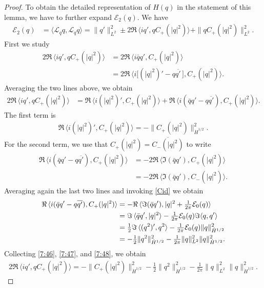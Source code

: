 \documentclass[10pt,a4paper]{amsart}
\newcommand{\Lc}{\mathcal{L}}
\newcommand{\lan}{\langle}
\newcommand{\ran}{\rangle}
\begin{document}
\begin{proof}
To obtain the detailed representation of $H(q)$ in the statement of this lemma, we have to further expand $\mathcal E_2(q)$.  We have
\begin{align}\label{eqn:E_2_expansion}
\mathcal{E}_2(q)&=\lan \Lc_qq,\Lc_qq\ran=\|q'\|_{L^2}^2\pm 2\Re\,\lan iq',q C_+(|q|^2)\ran+\|q C_+(|q|^2)\|_{L^2}^2.
\end{align}
First we study
\begin{align*}
2\Re\,\lan iq',q C_+(|q|^2)\ran&=2\Re\,\lan i\bar{q}q', C_+(|q|^2)\ran\\
&=2\Re\,\lan i\bigl[(|q|^2)'-q\overline{q'}\,\bigr], C_+(|q|^2)\ran.
\end{align*}
Averaging the two lines above, we obtain
\begin{align}\label{7:46}
2\Re\,\lan iq',q C_+(|q|^2)\ran&=\Re\,\lan i(|q|^2)', C_+(|q|^2)\ran+\Re\,\lan i(\bar{q}q'-q\overline{q'}), C_+(|q|^2)\ran.
\end{align}
The first term is
\begin{align}\label{7:47}
\Re\,\lan i(|q|^2)', C_+(|q|^2)\ran=-\| C_+(|q|^2)\|_{\dot{H}^{1/2}}^2.
\end{align}
For the second term, we use that $ C_+(|q|^2)=\overline{C_-(|q|^2)}$ to write
\begin{align*}
\Re\,\lan i(\bar{q}q'-q\overline{q'}), C_+(|q|^2)\ran
&=-2\Re\,\lan\Im(\bar{q}q'), C_+(|q|^2)\ran\\
&=-2\Re\,\lan\Im(\bar{q}q'),C_-(|q|^2)\ran.
\end{align*}
Averaging again the last two lines and invoking \eqref{Cid} we obtain
\begin{align}\label{7:48}
\Re\, \lan i(\bar{q}q'-q\overline{q'}), C_+(|q|^2)\ran\notag
&=-\Re\,\lan \Im(\bar{q}q'),|q|^2+\tfrac1{2\pi}\mathcal{E}_0(q)\ran\notag\\
&=\Im\,\lan\bar{q}q',|q|^2\ran-\tfrac1{2\pi}\mathcal{E}_0(q)\Im\lan q,q'\ran\notag\\
&=\tfrac12 \Im\,\lan (q^2)',q^2\ran-\tfrac1{2\pi}\mathcal{E}_0(q)\|q\|_{\dot H^{1/2}}^2\notag\\
&=-\tfrac12\|q^2\|_{\dot{H}^{1/2}}^2-\tfrac1{2\pi}\|q\|_{L^2}^2\|q\|_{\dot{H}^{1/2}}^2.
\end{align}
Collecting \eqref{7:46}, \eqref{7:47}, and \eqref{7:48}, we obtain
\begin{align}\label{7:49}
2\Re\,\lan iq',q C_+(|q|^2)\ran=-\| C_+(|q|^2)\|_{\dot{H}^{1/2}}^2-\tfrac12\|q^2\|_{\dot{H}^{1/2}}^2-\tfrac1{2\pi}\|q\|_{L^2}^2\|q\|_{\dot{H}^{1/2}}^2.
\end{align}


\end{proof}
\end{document}
